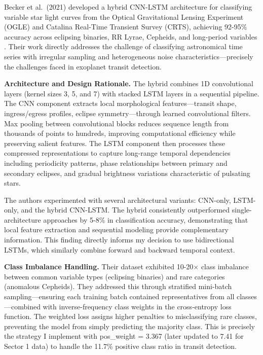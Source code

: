 \documentclass[letterpaper]{article} %
\begin{document}
Becker et al.\ (2021) developed a hybrid CNN-LSTM architecture for classifying variable star light curves from the Optical Gravitational Lensing Experiment (OGLE) and Catalina Real-Time Transient Survey (CRTS), achieving 92-95\% accuracy across eclipsing binaries, RR Lyrae, Cepheids, and long-period variables \cite{Becker2021variablestars}. Their work directly addresses the challenge of classifying astronomical time series with irregular sampling and heterogeneous noise characteristics---precisely the challenges faced in exoplanet transit detection.

\textbf{Architecture and Design Rationale.} The hybrid combines 1D convolutional layers (kernel sizes 3, 5, and 7) with stacked LSTM layers in a sequential pipeline. The CNN component extracts local morphological features---transit shape, ingress/egress profiles, eclipse symmetry---through learned convolutional filters. Max pooling between convolutional blocks reduces sequence length from thousands of points to hundreds, improving computational efficiency while preserving salient features. The LSTM component then processes these compressed representations to capture long-range temporal dependencies including periodicity patterns, phase relationships between primary and secondary eclipses, and gradual brightness variations characteristic of pulsating stars.

The authors experimented with several architectural variants: CNN-only, LSTM-only, and the hybrid CNN-LSTM. The hybrid consistently outperformed single-architecture approaches by 5-8\% in classification accuracy, demonstrating that local feature extraction and sequential modeling provide complementary information. This finding directly informs my decision to use bidirectional LSTMs, which similarly combine forward and backward temporal context.

\textbf{Class Imbalance Handling.} Their dataset exhibited 10-20$\times$ class imbalance between common variable types (eclipsing binaries) and rare categories (anomalous Cepheids). They addressed this through stratified mini-batch sampling---ensuring each training batch contained representatives from all classes---combined with inverse-frequency class weights in the cross-entropy loss function. The weighted loss assigns higher penalties to misclassifying rare classes, preventing the model from simply predicting the majority class. This is precisely the strategy I implement with pos\_weight = 3.367 (later updated to 7.41 for Sector 1 data) to handle the 11.7\% positive class ratio in transit detection.
\end{document}

